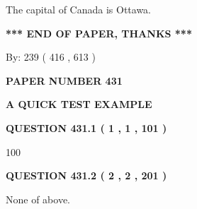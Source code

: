 \documentclass[12pt]{article}
\begin{document}
  
 
 
\noindent{}
 
 
The capital of Canada is Ottawa.
 
 
 
 
   
   
 \vspace{0.2in}
 
   
   
   
   
\vspace{1.0in} 
{\textbf{\large{ *** END OF PAPER, THANKS *** }}} 
   
   
\hspace{1.0in} By: 
 239 ( 416 ,  613 )
   
   
   
   
\newpage 
\setcounter{page}{ 
   431001 } 
   
   
   
   
 {\textbf{ \Large{ PAPER NUMBER  431  }}}
   
   
\vspace{0.2in}
   
   
   
   
   
   
 \vspace{0.2in}
{\LARGE {\textbf{ A QUICK TEST EXAMPLE}}}
   
   
  
\vspace{0.2in}
  
{\textbf{\Large{QUESTION
431.1 
 ( 1 , 1 , 101 )
}}}
  
  
 
 
\noindent{}

100
 
 
  
\vspace{0.2in}
  
{\textbf{\Large{QUESTION
431.2 
 ( 2 , 2 , 201 )
}}}
  
  
 
 
\noindent{}
 
 
 None of above.
 
\end{document}
